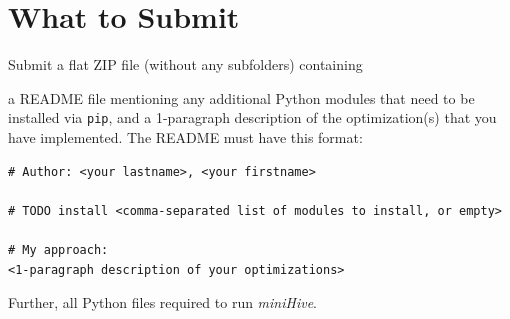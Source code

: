 \documentclass[12pt]{exam}
\begin{document}
\section{What to Submit}

Submit a flat ZIP file (without any subfolders) containing

\begin{compactitem}
    \item a README file mentioning any additional Python modules that need to be installed via \verb!pip!, and a 1-paragraph description of the optimization(s) that you have implemented. The README must have this format:

    \begin{Verbatim}[frame=single,fontsize=\small]
# Author: <your lastname>, <your firstname>

# TODO install <comma-separated list of modules to install, or empty>
        
# My approach:
<1-paragraph description of your optimizations>
    \end{Verbatim}
    
    
    \item Further, all Python files required to run {\em miniHive}. 

\end{compactitem}
\end{document}
